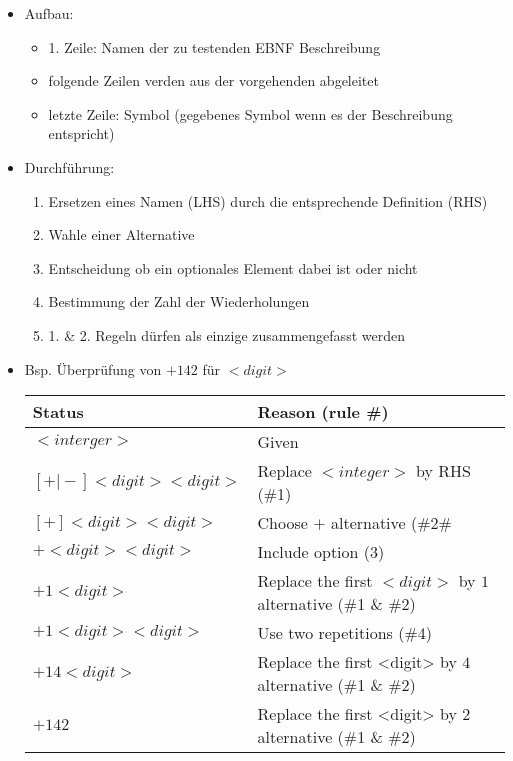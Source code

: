 \documentclass[11pt]{article}
\begin{document}
\begin{itemize}
\item Aufbau:\\
\begin{itemize}
\item 1. Zeile: Namen der zu testenden EBNF Beschreibung\\
\item folgende Zeilen verden aus der vorgehenden abgeleitet\\
\item letzte Zeile: Symbol (gegebenes Symbol wenn es der Beschreibung entspricht)\\
\end{itemize}

\item Durchführung:\\
\begin{enumerate}
\item Ersetzen eines Namen (LHS) durch die entsprechende Definition (RHS)\\
\item Wahle einer Alternative\\
\item Entscheidung ob ein optionales Element dabei ist oder nicht\\
\item Bestimmung der Zahl der Wiederholungen\\

\item 1. \& 2. Regeln dürfen als einzige zusammengefasst werden\\
\end{enumerate}

\item Bsp. Überprüfung von \(+142\) für \(<digit>\)\\
\begin{center}
\begin{tabular}{ll}
Status & Reason (rule \#)\\
\hline
\(<interger>\) & Given\\
\([+ \vert -]<digit>{<digit>}\) & Replace \(<integer>\) by RHS (\#1)\\
\([+]<digit>{<digit>}\) & Choose \(+\) alternative (\#2\#\\
\(+<digit>{<digit>}\) & Include option (3)\\
\(+1{<digit>}\) & Replace the first \(<digit>\) by \(1\) alternative (\#1 \& \#2)\\
\(+1<digit><digit>\) & Use two repetitions (\#4)\\
\(+14<digit>\) & Replace the first <digit> by \(4\) alternative (\#1 \& \#2)\\
\(+142\) & Replace the first <digit> by \(2\) alternative (\#1 \& \#2)\\
\end{tabular}
\end{center}
\end{itemize}
\end{document}

